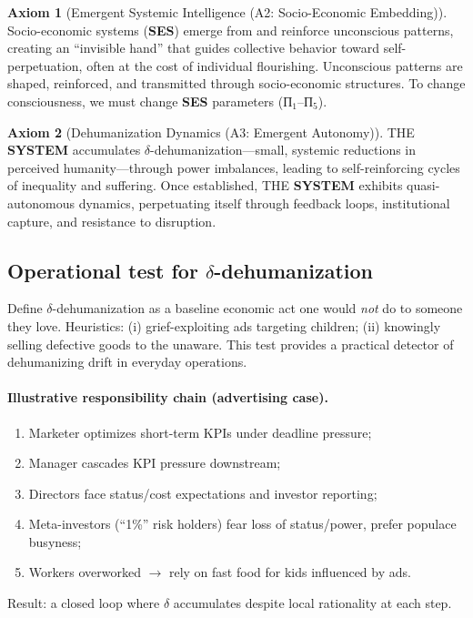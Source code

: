 \documentclass[11pt,a4paper]{article}
\newcommand{\SYSTEM}{\textbf{SYSTEM}}
\newcommand{\SES}{\textbf{SES}}
\newcommand{\deltaDehum}{$\delta$-dehumanization}
\theoremstyle{definition}
\newtheorem{axiom}{Axiom}[section]
\theoremstyle{remark}
\begin{document}
\begin{axiom}[Emergent Systemic Intelligence (A2: Socio-Economic Embedding)]
\label{ax:emergence}
Socio-economic systems (\SES{}) emerge from and reinforce unconscious patterns, creating an ``invisible hand'' that guides collective behavior toward self-perpetuation, often at the cost of individual flourishing. Unconscious patterns are shaped, reinforced, and transmitted through socio-economic structures. To change consciousness, we must change \SES{} parameters (П$_1$--П$_5$).
\end{axiom}

\begin{axiom}[Dehumanization Dynamics (A3: Emergent Autonomy)]
\label{ax:dehumanization}
THE \SYSTEM{} accumulates \deltaDehum{}---small, systemic reductions in perceived humanity---through power imbalances, leading to self-reinforcing cycles of inequality and suffering. Once established, THE \SYSTEM{} exhibits quasi-autonomous dynamics, perpetuating itself through feedback loops, institutional capture, and resistance to disruption.
\end{axiom}

\subsection{Operational test for $\delta$-dehumanization}
\label{subsec:delta_test}

Define $\delta$-dehumanization as a baseline economic act one would \emph{not} do to someone they love. Heuristics: (i) grief-exploiting ads targeting children; (ii) knowingly selling defective goods to the unaware. This test provides a practical detector of dehumanizing drift in everyday operations. %

\paragraph{Illustrative responsibility chain (advertising case).}
\begin{enumerate}\itemsep0.2em
\item Marketer optimizes short-term KPIs under deadline pressure;
\item Manager cascades KPI pressure downstream;
\item Directors face status/cost expectations and investor reporting;
\item Meta-investors (``1\%'' risk holders) fear loss of status/power, prefer populace busyness;
\item Workers overworked $\rightarrow$ rely on fast food for kids influenced by ads.
\end{enumerate}
Result: a closed loop where $\delta$ accumulates despite local rationality at each step. %
\end{document}
